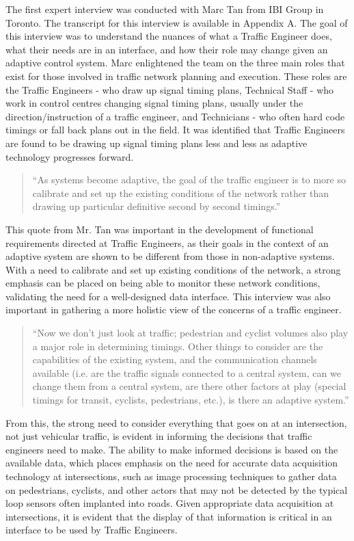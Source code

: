 \documentclass{report}
\begin{document}
The first expert interview was conducted with Marc Tan from IBI Group in Toronto.
The transcript for this interview is available in Appendix A. 
The goal of this interview was to understand the nuances of what a Traffic Engineer does, what their needs are in an interface, and how their role may change given an adaptive control system.
Marc enlightened the team on the three main roles that exist for those involved in traffic network planning and execution.
These roles are the Traffic Engineers - who draw up signal timing plans, Technical Staff - who work in control centres changing signal timing plans, usually under the direction/instruction of a traffic engineer, and Technicians - who often hard code timings or fall back plans out in the field.
It was identified that Traffic Engineers are found to be drawing up signal timing plans less and less as adaptive technology progresses forward.
\begin{quote}
``As systems become adaptive, the goal of the traffic engineer is to more so calibrate and set up the existing conditions of the network rather than drawing up particular definitive second by second timings.''
\end{quote}
This quote from Mr. Tan was important in the development of functional requirements directed at Traffic Engineers, as their goals in the context of an adaptive system are shown to be different from those in non-adaptive systems.
With a need to calibrate and set up existing conditions of the network, a strong emphasis can be placed on being able to monitor these network conditions, validating the need for a well-designed data interface.
This interview was also important in gathering a more holistic view of the concerns of a traffic engineer.
\begin{quote}
``Now we don't just look at traffic; pedestrian and cyclist volumes also play a major role in determining timings.
Other things to consider are the capabilities of the existing system, and the communication channels available (i.e. are the traffic signals connected to a central system, can we change them from a central system, are there other factors at play (special timings for transit, cyclists, pedestrians, etc.), is there an adaptive system.''
\end{quote}
From this, the strong need to consider everything that goes on at an intersection, not just vehicular traffic, is evident in informing the decisions that traffic engineers need to make.
The ability to make informed decisions is based on the available data, which places emphasis on the need for accurate data acquisition technology at intersections, such as image processing techniques to gather data on pedestrians, cyclists, and other actors that may not be detected by the typical loop sensors often implanted into roads.
Given appropriate data acquisition at intersections, it is evident that the display of that information is critical in an interface to be used by Traffic Engineers.
\end{document}
